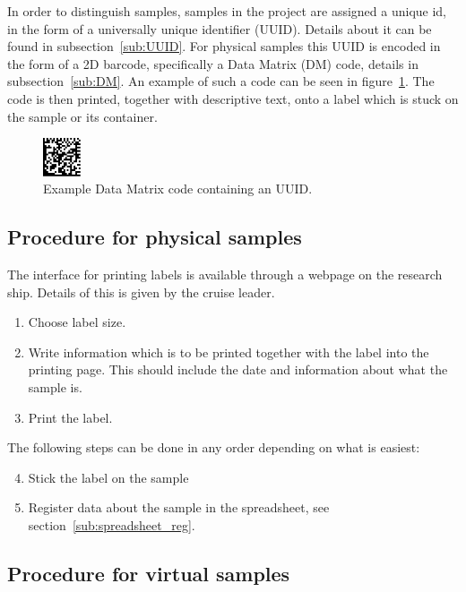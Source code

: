\documentclass[a4paper,english, 11pt]{article}
\begin{document}
In order to distinguish samples, samples in the project are assigned a unique id, in the form of a universally unique identifier (UUID). Details about it can be found in subsection~\ref{sub:UUID}. For physical samples this UUID is encoded in the form of a 2D barcode, specifically a Data Matrix (DM) code, details in subsection~\ref{sub:DM}. An example of such a code can be seen in figure~\ref{fig:data_matrix}. The code is then printed, together with descriptive text, onto a label which is stuck on the sample or its container.

\begin{figure}[htb]
    \centering
    \includegraphics[width=0.1\textwidth]{Data_matrix.png}
    \caption{\label{fig:data_matrix}
        Example Data Matrix code containing an UUID.
    }
\end{figure}

\subsection{Procedure for physical samples} %
\label{sub:Procedure for physical samples}


The interface for printing labels is available through a webpage on the research ship. Details of this is given by the cruise leader.

\begin{enumerate}
    \item Choose label size.
    \item Write information which is to be printed together with the label into the printing page. This should include the date and information about what the sample is.
    \item Print the label.  
\end{enumerate}
The following steps can be done in any order depending on what is easiest:
\begin{enumerate}
\setcounter{enumi}{3}
    \item Stick the label on the sample
    \item Register data about the sample in the spreadsheet, see section~\ref{sub:spreadsheet_reg}.
\end{enumerate}


\subsection{Procedure for virtual samples} %
\label{sub:Procedure for virtual samples}
\end{document}
